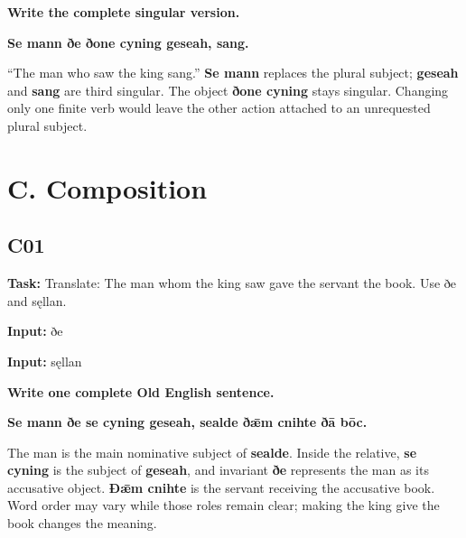 \par\begin{minipage}{\linewidth}\raggedright
\textbf{Write the complete singular version.}

\textbf{Se mann ðe ðone cyning geseah, sang.}
\end{minipage}\par

“The man who saw the king sang.” \textbf{Se mann} replaces the plural subject; \textbf{geseah} and \textbf{sang} are third singular. The object \textbf{ðone cyning} stays singular. Changing only one finite verb would leave the other action attached to an unrequested plural subject.

\section*{C. Composition}

\subsection*{C01}

\textbf{Task:} Translate: The man whom the king saw gave the servant the book. Use ðe and sęllan.

\textbf{Input:} ðe

\textbf{Input:} sęllan

\par\begin{minipage}{\linewidth}\raggedright
\textbf{Write one complete Old English sentence.}

\textbf{Se mann ðe se cyning geseah, sealde ðǣm cnihte ðā bōc.}
\end{minipage}\par

The man is the main nominative subject of \textbf{sealde}. Inside the relative, \textbf{se cyning} is the subject of \textbf{geseah}, and invariant \textbf{ðe} represents the man as its accusative object. \textbf{Ðǣm cnihte} is the servant receiving the accusative book. Word order may vary while those roles remain clear; making the king give the book changes the meaning.

